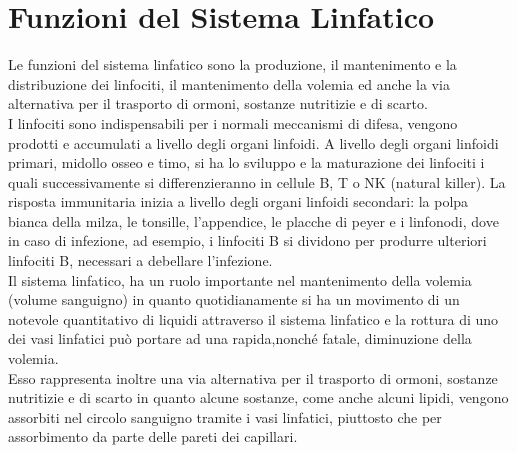 \section{Funzioni del Sistema Linfatico}
Le funzioni del sistema linfatico sono la produzione, il mantenimento e la distribuzione dei linfociti, 
il mantenimento della volemia ed anche la via alternativa per il trasporto di ormoni,
sostanze nutritizie e di scarto\cite{BOOK1}.\\
I linfociti sono indispensabili per i normali meccanismi di difesa, vengono prodotti e accumulati a livello 
degli organi linfoidi. 
A livello degli organi linfoidi primari, midollo osseo e timo, si ha lo sviluppo e la maturazione dei linfociti 
i quali successivamente si differenzieranno in cellule B, T o NK (natural killer)\cite{BOOK1}.
La risposta immunitaria inizia a livello degli organi linfoidi secondari: la polpa bianca della milza, le tonsille, 
l’appendice, le placche di peyer e i linfonodi, dove in caso di infezione, ad esempio,
i linfociti B si dividono per produrre ulteriori linfociti B, necessari a debellare l’infezione.\\
Il sistema linfatico, ha un ruolo importante nel mantenimento della volemia (volume sanguigno) in quanto 
quotidianamente si ha un movimento di un notevole quantitativo di liquidi attraverso il sistema linfatico e 
la rottura di uno dei vasi linfatici può portare ad una rapida,nonché fatale, diminuzione della volemia\cite{BOOK1}.\\
Esso rappresenta inoltre una via alternativa per il trasporto di ormoni, sostanze nutritizie e 
di scarto in quanto alcune sostanze, come anche alcuni lipidi, vengono assorbiti nel circolo sanguigno tramite 
i vasi linfatici, piuttosto che per assorbimento da parte delle pareti dei capillari\cite{BOOK1}.

